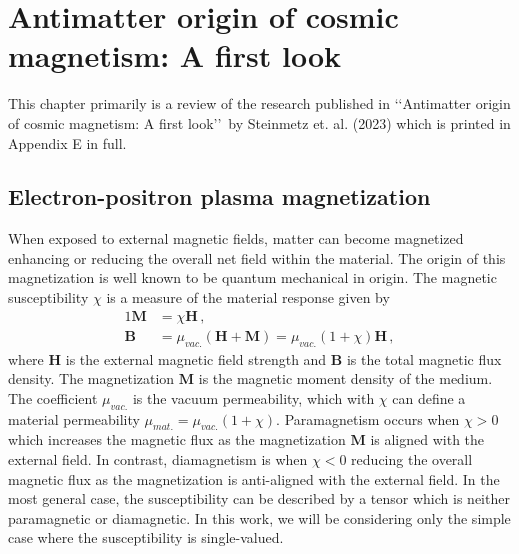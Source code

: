 \chapter{Antimatter origin of cosmic magnetism: A first look}
\label{chap:cosmo}
\noindent This chapter primarily is a review of the research published in \lq\lq Antimatter origin of cosmic magnetism: A first look\rq\rq\ by Steinmetz et. al. (2023) which is printed in Appendix E in full.\\

\section{Electron-positron plasma magnetization}
\label{section:magnetization}
\noindent When exposed to external magnetic fields, matter can become magnetized enhancing or reducing the overall net field within the material. The origin of this magnetization is well known to be quantum mechanical in origin. The magnetic susceptibility $\chi$ is a measure of the material response given by
\begin{alignat}{1}
  \label{CHIeq01} \textbf{M}&=\chi\textbf{H}\,,\\
  \label{CHIeq02} \textbf{B}&=\mu_{vac.}\left(\textbf{H}+\textbf{M}\right)=\mu_{vac.}\left(1+\chi\right)\textbf{H}\,,
\end{alignat}
where $\textbf{H}$ is the external magnetic field strength and $\textbf{B}$ is the total magnetic flux density. The magnetization $\textbf{M}$ is the magnetic moment density of the medium. The coefficient $\mu_{vac.}$ is the vacuum permeability, which with $\chi$ can define a material permeability $\mu_{mat.}=\mu_{vac.}(1+\chi)$. Paramagnetism occurs when $\chi>0$ which increases the magnetic flux as the magnetization $\textbf{M}$ is aligned with the external field. In contrast, diamagnetism is when $\chi<0$ reducing the overall magnetic flux as the magnetization is anti-aligned with the external field. In the most general case, the susceptibility can be described by a tensor which is neither paramagnetic or diamagnetic. In this work, we will be considering only the simple case where the susceptibility is single-valued.

